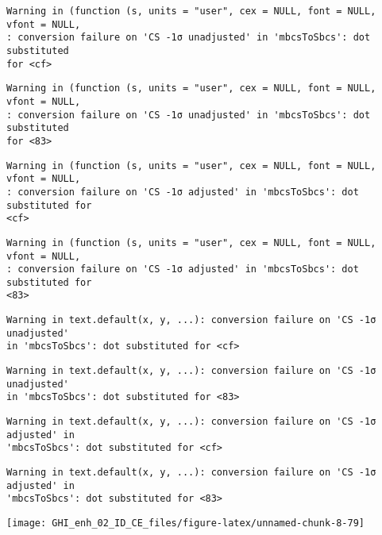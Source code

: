 \documentclass[
  10pt,
  a4paper,oneside]{article}
\begin{document}
\begin{verbatim}
Warning in (function (s, units = "user", cex = NULL, font = NULL, vfont = NULL,
: conversion failure on 'CS -1σ unadjusted' in 'mbcsToSbcs': dot substituted
for <cf>
\end{verbatim}

\begin{verbatim}
Warning in (function (s, units = "user", cex = NULL, font = NULL, vfont = NULL,
: conversion failure on 'CS -1σ unadjusted' in 'mbcsToSbcs': dot substituted
for <83>
\end{verbatim}

\begin{verbatim}
Warning in (function (s, units = "user", cex = NULL, font = NULL, vfont = NULL,
: conversion failure on 'CS -1σ adjusted' in 'mbcsToSbcs': dot substituted for
<cf>
\end{verbatim}

\begin{verbatim}
Warning in (function (s, units = "user", cex = NULL, font = NULL, vfont = NULL,
: conversion failure on 'CS -1σ adjusted' in 'mbcsToSbcs': dot substituted for
<83>
\end{verbatim}

\begin{verbatim}
Warning in text.default(x, y, ...): conversion failure on 'CS -1σ unadjusted'
in 'mbcsToSbcs': dot substituted for <cf>
\end{verbatim}

\begin{verbatim}
Warning in text.default(x, y, ...): conversion failure on 'CS -1σ unadjusted'
in 'mbcsToSbcs': dot substituted for <83>
\end{verbatim}

\begin{verbatim}
Warning in text.default(x, y, ...): conversion failure on 'CS -1σ adjusted' in
'mbcsToSbcs': dot substituted for <cf>
\end{verbatim}

\begin{verbatim}
Warning in text.default(x, y, ...): conversion failure on 'CS -1σ adjusted' in
'mbcsToSbcs': dot substituted for <83>
\end{verbatim}

\begin{center}\texttt{[image: GHI\_enh\_02\_ID\_CE\_files/figure-latex/unnamed-chunk-8-79]} \end{center}
\end{document}
